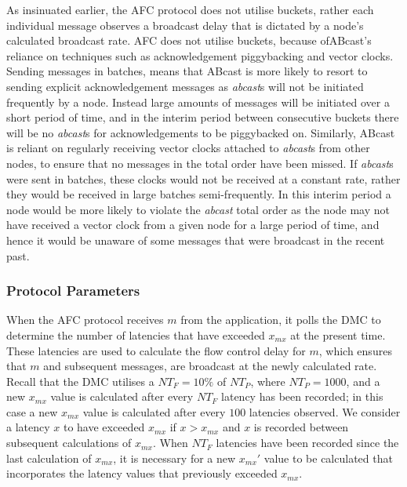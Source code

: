     As insinuated earlier, the AFC protocol does not utilise buckets, rather each individual message observes a broadcast delay that is dictated by a node's calculated broadcast rate.  AFC does not utilise buckets, because of\textsf{ABcast}'s reliance on techniques such as acknowledgement piggybacking and vector clocks.  Sending messages in batches, means that \textsf{ABcast} is more likely to resort to sending explicit acknowledgement messages as \emph{abcast}s will not be initiated frequently by a node.  Instead large amounts of messages will be initiated over a short period of time, and in the interim period between consecutive buckets there will be no \emph{abcast}s for acknowledgements to be piggybacked on.  Similarly, \textsf{ABcast} is reliant on regularly receiving vector clocks attached to \emph{abcast}s from other nodes, to ensure that no messages in the total order have been missed.  If \emph{abcast}s were sent in batches, these clocks would not be received at a constant rate, rather they would be received in large batches semi-frequently.  In this interim period a node would be more likely to violate the \emph{abcast} total order as the node may not have received a vector clock from a given node for a large period of time, and hence it would be unaware of some messages that were broadcast in the recent past.  
   
   \subsubsection*{Protocol Parameters}  
   When the AFC protocol receives $m$ from the application, it polls the DMC to determine the number of latencies that have exceeded $x_{mx}$ at the present time.  These latencies are used to calculate the flow control delay for $m$, which ensures that $m$ and subsequent messages, are broadcast at the newly calculated rate.  Recall that the DMC utilises a $NT_F = 10\%$ of $NT_P$, where $NT_P = 1000$, and a new $x_{mx}$ value is calculated after every $NT_F$ latency has been recorded; in this case a new $x_{mx}$ value is calculated after every $100$ latencies observed.    We consider a latency $x$ to have exceeded $x_{mx}$ if $x > x_{mx}$ and $x$ is recorded between subsequent calculations of $x_{mx}$.  When $NT_F$ latencies have been recorded since the last calculation of $x_{mx}$, it is necessary for a new $x_{mx}'$ value to be calculated that incorporates the latency values that previously exceeded $x_{mx}$.  
   
       
